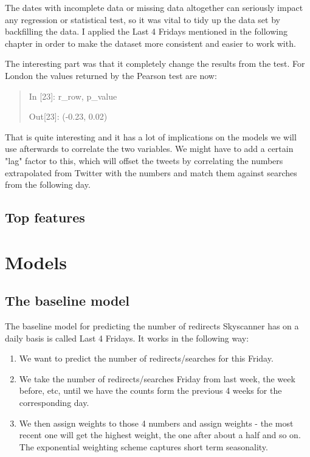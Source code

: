 \documentclass[minf,frontabs,twoside,singlespacing,parskip]{infthesis}
\begin{document}
The dates with incomplete data or missing data altogether can seriously impact any regression or statistical test, so it was vital to tidy up the data set by backfilling the data. I applied the Last 4 Fridays mentioned in the following chapter in order to make the dataset more consistent and easier to work with. 

The interesting part was that it completely change the results from the test. For London the values returned by the Pearson test are now:

\begin{quotation}
In [23]: r\_row, p\_value

Out[23]: (-0.23, 0.02)
\end{quotation}

That is quite interesting and it has a lot of implications on the models we will use afterwards to correlate the two variables. 
We might have to add a certain "lag" factor to this, which will offset the tweets by correlating the numbers extrapolated from Twitter with the numbers and match them against searches from the following day.

\section{Top features}



\chapter{Models}

\section{The baseline model}

The baseline model for predicting the number of redirects Skyscanner has on a daily basis is called Last 4 Fridays. 
It works in the following way:
\begin{enumerate}
\item We want to predict the number of redirects/searches for this Friday.
\item We take the number of redirects/searches Friday from last week, the week before, etc, until we have the counts form the previous 4 weeks for the corresponding day.
\item We then assign weights to those 4 numbers and assign weights - the most recent one will get the highest weight, the one after about a half and so on. The exponential weighting scheme captures short term seasonality.
\end{enumerate}
\end{document}
